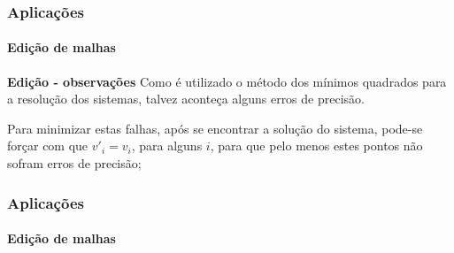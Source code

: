 \begin{frame}
	\frametitle{{\bf \color{blue} Aplicações}}
	\framesubtitle{\color{blue} Edição de malhas}
	
	\begin{block}{\bf Edição - observações}
Como é utilizado o método dos mínimos quadrados para a resolução dos sistemas, talvez aconteça alguns erros de precisão.
		
		\medskip
		
Para minimizar estas falhas, após se encontrar a solução do sistema, pode-se forçar com que $v'_i = v_i$, para alguns $i$, para que pelo menos estes pontos não sofram erros de precisão;
	\end{block}
\end{frame}

\begin{frame}
	\frametitle{{\bf \color{blue} Aplicações}}
	\framesubtitle{\color{blue} Edição de malhas}
	

\end{frame}
